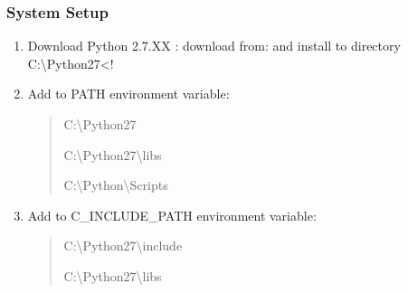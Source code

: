 \documentclass[letterpaper,10pt,english]{sphinxmanual}
\begin{document}
\subsubsection{System Setup}
\label{\detokenize{DevelopmentGuidelines:system-setup}}\begin{enumerate}
\item {} 
Download Python 2.7.XX : download from:
 and install to directory
C:\textbackslash{}Python27\textless{}!\textendash{}

\item {} 
Add to PATH environment variable:
\begin{quote}

C:\textbackslash{}Python27

C:\textbackslash{}Python27\textbackslash{}libs

C:\textbackslash{}Python\textbackslash{}Scripts
\end{quote}

\item {} 
Add to C\_INCLUDE\_PATH environment variable:
\begin{quote}

C:\textbackslash{}Python27\textbackslash{}include

C:\textbackslash{}Python27\textbackslash{}libs
\end{quote}

\end{enumerate}
\end{document}
